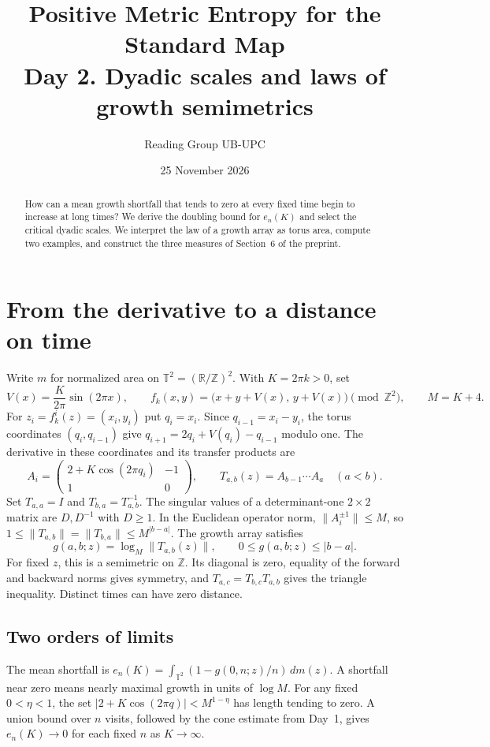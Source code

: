 \documentclass[11pt,a4paper]{article}
\title{\vspace{-1.4em}\textbf{Positive Metric Entropy for the Standard Map}\\[4pt]
  \large Day 2. Dyadic scales and laws of growth semimetrics}
\author{Reading Group UB-UPC}
\date{25 November 2026}
\newcommand{\R}{\mathbb{R}}
\newcommand{\T}{\mathbb{T}}
\newcommand{\Z}{\mathbb{Z}}
\newcommand{\norm}[1]{\lVert #1\rVert}
\begin{document}
\maketitle
\vspace{-1.2em}
\begin{abstract}
\noindent
How can a mean growth shortfall that tends to zero at every fixed time begin
to increase at long times? We derive the doubling bound for $e_n(K)$ and select
the critical dyadic scales. We interpret the law of a growth array as torus area,
compute two examples, and construct the three measures of Section~6 of the preprint.
\end{abstract}

\section{From the derivative to a distance on time}
Write $m$ for normalized area on $\T^2=(\R/\Z)^2$. With $K=2\pi k>0$, set
\[
 V(x)=\frac{K}{2\pi}\sin(2\pi x),\qquad
 f_k(x,y)=\bigl(x+y+V(x),\,y+V(x)\bigr)\pmod{\Z^2},\qquad M=K+4.
\]
For $z_i=f_k^i(z)=(x_i,y_i)$ put $q_i=x_i$. Since $q_{i-1}=x_i-y_i$,
the torus coordinates $(q_i,q_{i-1})$ give $q_{i+1}=2q_i+V(q_i)-q_{i-1}$ modulo one.
The derivative in these coordinates and its transfer products are
\[
 A_i=\begin{pmatrix}2+K\cos(2\pi q_i)&-1\\1&0\end{pmatrix},
 \qquad T_{a,b}(z)=A_{b-1}\cdots A_a\quad (a<b).
\]
Set $T_{a,a}=I$ and $T_{b,a}=T_{a,b}^{-1}$. The singular values of a determinant-one
$2\times2$ matrix are $D,D^{-1}$ with $D\ge1$. In the Euclidean operator norm,
$\norm{A_i^{\pm1}}\le M$, so $1\le\norm{T_{a,b}}=\norm{T_{b,a}}\le M^{|b-a|}$.
The growth array satisfies
\begin{equation}\label{eq:g}
 g(a,b;z)=\log_M\norm{T_{a,b}(z)},\qquad 0\le g(a,b;z)\le |b-a|.
\end{equation}
For fixed $z$, this is a semimetric on $\Z$. Its diagonal is zero, equality of the
forward and backward norms gives symmetry, and $T_{a,c}=T_{b,c}T_{a,b}$ gives the
triangle inequality. Distinct times can have zero distance.

\subsection*{Two orders of limits}
The mean shortfall is $e_n(K)=\int_{\T^2}(1-g(0,n;z)/n)\,dm(z)$. A shortfall near
zero means nearly maximal growth in units of $\log M$. For any fixed $0<\eta<1$,
the set $|2+K\cos(2\pi q)|<M^{1-\eta}$ has length tending to zero. A union bound
over $n$ visits, followed by the cone estimate from Day~1, gives $e_n(K)\to0$
for each fixed $n$ as $K\to\infty$.
\end{document}
